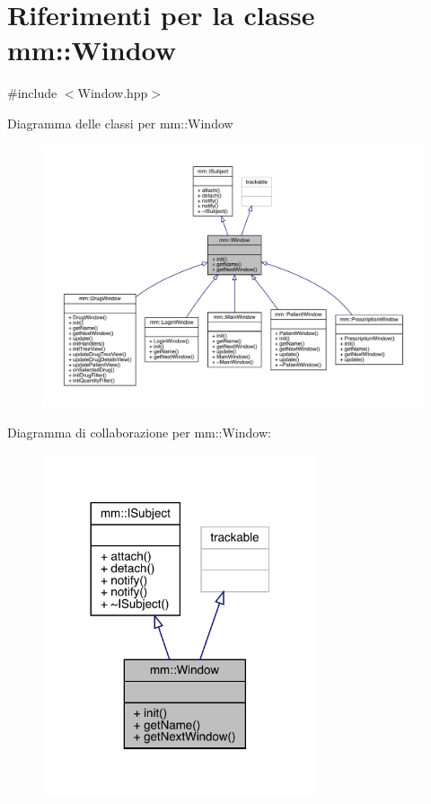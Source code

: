 \hypertarget{classmm_1_1_window}{}\section{Riferimenti per la classe mm\+:\+:Window}
\label{classmm_1_1_window}


{\ttfamily \#include $<$Window.\+hpp$>$}



Diagramma delle classi per mm\+:\+:Window
\nopagebreak
\begin{figure}[H]
\begin{center}
\leavevmode
\includegraphics[width=350pt]{d8/dab/classmm_1_1_window__inherit__graph}
\end{center}
\end{figure}


Diagramma di collaborazione per mm\+:\+:Window\+:
\nopagebreak
\begin{figure}[H]
\begin{center}
\leavevmode
\includegraphics[width=228pt]{d3/d0c/classmm_1_1_window__coll__graph}
\end{center}
\end{figure}
